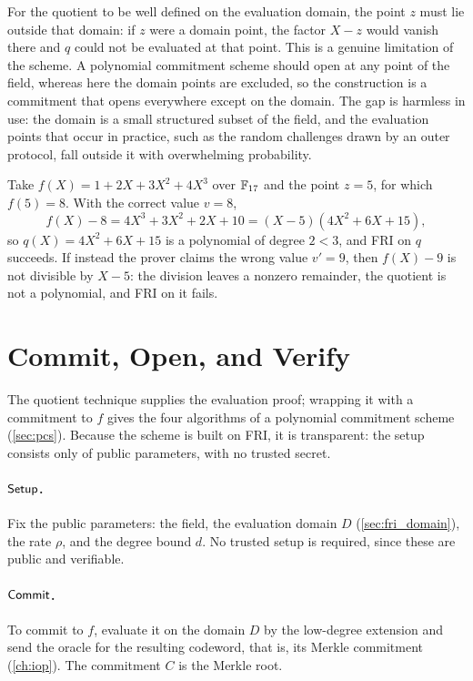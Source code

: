 For the quotient to be well defined on the evaluation domain, the point
$z$ must lie outside that domain: if $z$ were a domain point, the factor
$X - z$ would vanish there and $q$ could not be evaluated at that point.
This is a genuine limitation of the scheme. A polynomial commitment
scheme should open at any point of the field, whereas here the domain
points are excluded, so the construction is a commitment that opens
everywhere except on the domain. The gap is harmless in use: the domain
is a small structured subset of the field, and the evaluation points that
occur in practice, such as the random challenges drawn by an outer
protocol, fall outside it with overwhelming probability.

\begin{example}
\label{ex:quotient}
Take $f(X) = 1 + 2X + 3X^2 + 4X^3$ over $\mathbb{F}_{17}$ and the point $z = 5$,
for which $f(5) = 8$. With the correct value $v = 8$,
%
\[
f(X) - 8 = 4X^3 + 3X^2 + 2X + 10 = (X - 5)(4X^2 + 6X + 15),
\]
%
so $q(X) = 4X^2 + 6X + 15$ is a polynomial of degree $2 < 3$, and FRI on
$q$ succeeds. If instead the prover claims the wrong value $v' = 9$, then
$f(X) - 9$ is not divisible by $X - 5$: the division leaves a nonzero
remainder, the quotient is not a polynomial, and FRI on it fails.
\end{example}


\section{Commit, Open, and Verify}
\label{sec:commit_open_verify}

The quotient technique supplies the evaluation proof; wrapping it with a
commitment to $f$ gives the four algorithms of a polynomial commitment
scheme (\cref{sec:pcs}). Because the scheme is built on FRI, it is
transparent: the setup consists only of public parameters, with no
trusted secret.

\paragraph{$\mathsf{Setup}$.} Fix the public parameters: the field, the
evaluation domain $D$ (\cref{sec:fri_domain}), the rate $\rho$, and the
degree bound $d$. No trusted setup is required, since these are public
and verifiable.

\paragraph{$\mathsf{Commit}$.} To commit to $f$, evaluate it on the domain $D$ by
the low-degree extension and send the oracle for the resulting codeword,
that is, its Merkle commitment (\cref{ch:iop}). The commitment $C$ is the
Merkle root.

